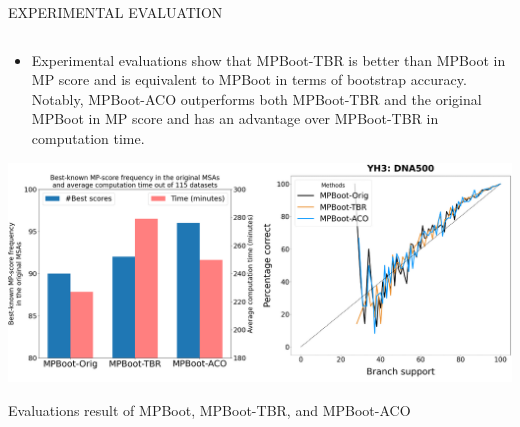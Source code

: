 \documentclass[%
  final,%
  english,%
]{beamer}
\begin{document}
\begin{frame}[t, fragile = singleslide]
\begin{columns}[t, onlytextwidth]
\begin{column}{\textwidth}
\begin{block}{EXPERIMENTAL EVALUATION}
\begin{columns}
\begin{column}{0.45\textwidth}
\begin{itemize}
    \item Experimental evaluations show that MPBoot-TBR is better than MPBoot in MP score and is equivalent to MPBoot in terms of bootstrap accuracy. Notably, MPBoot-ACO outperforms both MPBoot-TBR and the original MPBoot in MP score and has an advantage over MPBoot-TBR in computation time.
\end{itemize}
\vspace{0.7cm}
\begin{table}
\centering%
\includegraphics[width = 1\columnwidth]{./Figuras/results.png}
\caption{Evaluations result of MPBoot, MPBoot-TBR, and MPBoot-ACO}
\end{table}
\end{column}

\end{columns}
\end{block}
%
\end{column}
%
\end{columns}


\end{frame}
\end{document}
